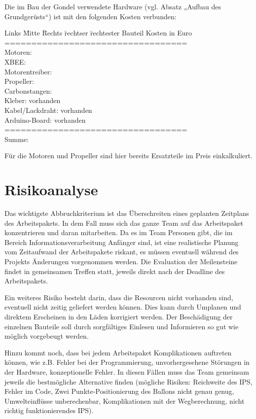 \documentclass[lang=ngerman,inputenc=utf8,fontsize=10pt]{ldvarticle}
\begin{document}
Die im Bau der Gondel verwendete Hardware (vgl. Absatz „Aufbau des Grundgerüsts“) ist mit den folgenden Kosten verbunden:
\begin{tabbing}
Links \= Mitte \= Rechts \= rechtser \= rechtester \kill
Bauteil		\>\>\>\>		Kosten in Euro\\
==================================\\
Motoren:\>\>\>	\\
XBEE:	\>\>	\>\>		20\\
Motorentreiber:	\>\>\>\\
Propeller:		\>\>\>\>	4\\
Carbonstangen:	\>\>\>\\
Kleber:	\>\>	\>\>		vorhanden\\
Kabel/Lackdraht:\>\>\>\>	vorhanden\\
Arduino-Board:	\>\>\>\>	vorhanden\\
==================================\\
Summe:			\>\>\>\>	55\\
\end{tabbing}
Für die Motoren und Propeller sind hier bereits Ersatzteile im Preis einkalkuliert. 

\section{Risikoanalyse}

Das wichtigste Abbruchkriterium ist das Überschreiten eines geplanten Zeitplans des Arbeitspakets. In dem Fall muss sich das ganze Team auf das Arbeitspaket konzentrieren und daran mitarbeiten. Da es im Team Personen gibt, die im Bereich Informationsverarbeitung Anfänger sind, ist eine realistische Planung vom Zeitaufwand der Arbeitspakete riskant, es müssen eventuell während des Projekts Änderungen vorgenommen werden. Die Evaluation der Meilensteine findet in gemeinsamen Treffen statt, jeweils direkt nach der Deadline des Arbeitspakets.


Ein weiteres Risiko besteht darin, dass die Resourcen nicht vorhanden sind, eventuell nicht zeitig geliefert werden können. Dies kann durch Umplanen und direktem Erscheinen in den Läden korrigiert werden. Der Beschädigung der einzelnen Bauteile soll durch sorgfältiges Einlesen und Informieren so gut wie möglich vorgebeugt werden.


Hinzu kommt noch, dass bei jedem Arbeitspaket Komplikationen auftreten können, wie z.B. Fehler bei der Programmierung, unvorhergesehene Störungen in der Hardware, konzeptionelle Fehler. In diesen Fällen muss das Team gemeinsam jeweils die bestmögliche Alternative finden (mögliche Risiken: Reichweite des IPS, Fehler im Code, Zwei Punkte-Positionierung des Ballons nicht genau genug, Umwelteinflüsse unberechenbar, Komplikationen mit der Wegberechnung, nicht richtig funktionierendes IPS).
\end{document}

